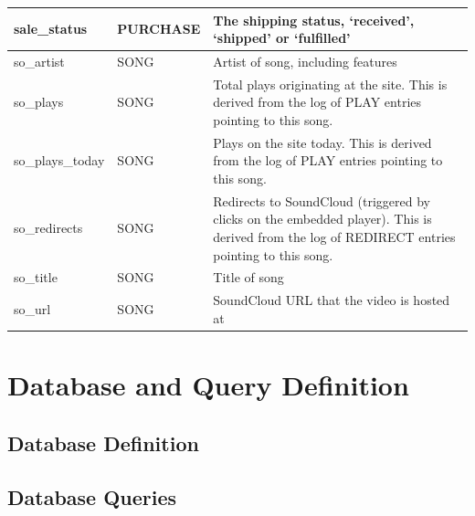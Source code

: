 \documentclass[11pt, a4paper]{report}
\begin{document}
\begin{longtable}{|l|p{4.4cm}|p{7cm}|}
sale\_status            & PURCHASE               & The shipping status, `received', `shipped' or `fulfilled'                                                                                                             \\ \hline
so\_artist              & SONG                   & Artist of song, including features                                                                                                                                    \\ \hline
so\_plays               & SONG                   & Total plays originating at the site. This is derived from the log of PLAY entries pointing to this song.                                                              \\ \hline
so\_plays\_today        & SONG                   & Plays on the site today. This is derived from the log of PLAY entries pointing to this song.                                                                          \\ \hline
so\_redirects           & SONG                   & Redirects to SoundCloud (triggered by clicks on the embedded player). This is derived from the log of REDIRECT entries pointing to this song.                         \\ \hline
so\_title               & SONG                   & Title of song                                                                                                                                                         \\ \hline
so\_url                 & SONG                   & SoundCloud URL that the video is hosted at                                                                                                                            \\ \hline
\end{longtable}

\chapter{Database and Query Definition}

\section{Database Definition}
    

\clearpage
\section{Database Queries}
    
\end{document}
